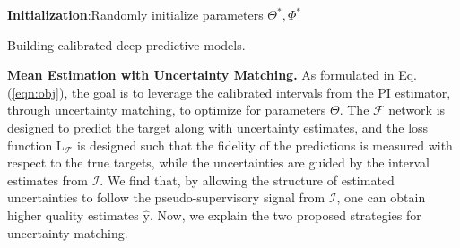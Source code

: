 \documentclass[letterpaper]{article} %
\begin{document}
\begin{algorithm}[t]

	\textbf{Initialization}:Randomly initialize parameters $\Theta^*,\Phi^*$\;
	\caption{Building calibrated deep predictive models.}\label{algo}
\end{algorithm}


\noindent \textbf{Mean Estimation with Uncertainty Matching.}
\label{mean}
As formulated in Eq. (\ref{eqn:obj}), the goal is to leverage the calibrated intervals from the PI estimator, through uncertainty matching, to optimize for parameters $\Theta$. The $\mathcal{F}$ network is designed to predict the target along with uncertainty estimates, and the loss function $\mathrm{L}_{\mathcal{F}}$ is designed such that the fidelity of the predictions is measured with respect to the true targets, while the uncertainties are guided by the interval estimates from $\mathcal{I}$. We find that, by allowing the structure of estimated uncertainties to follow the pseudo-supervisory signal from $\mathcal{I}$, one can obtain higher quality estimates $\hat{\mathrm{y}}$. Now, we explain the two proposed strategies for uncertainty matching.
\end{document}
